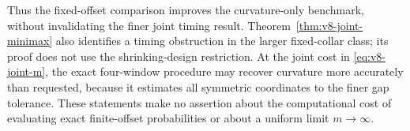 Thus the fixed-offset comparison improves the curvature-only benchmark,
without invalidating the finer joint timing result. Theorem~\ref{thm:v8-joint-minimax}
also identifies a timing obstruction in the larger fixed-collar class;
its proof does not use the shrinking-design restriction. At the joint
cost in \eqref{eq:v8-joint-m}, the exact four-window procedure may
recover curvature more accurately than requested, because it estimates
all symmetric coordinates to the finer gap tolerance. These statements
make no assertion about the computational cost of evaluating exact
finite-offset probabilities or about a uniform limit $m\to\infty$.
